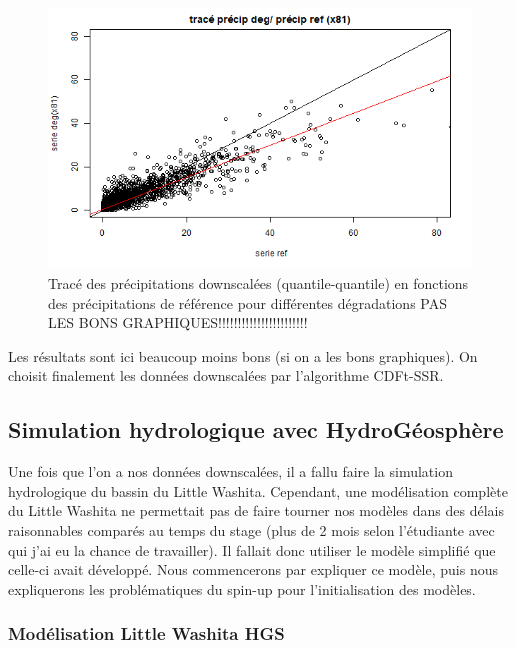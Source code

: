 \documentclass[a4paper,11pt]{article}
\numberwithin{equation}{section}
\begin{document}
\begin{figure}[H]
\begin{minipage}[b]{0.4\linewidth}
	\end{minipage}\hfill
	\begin{minipage}[b]{0.4\linewidth}	
		\centering \includegraphics[scale=0.4]{images/pr_4_dg.png}
	\end{minipage}
	\caption{Tracé des précipitations downscalées (quantile-quantile) en fonctions des précipitations de référence pour différentes dégradations PAS LES BONS GRAPHIQUES!!!!!!!!!!!!!!!!!!!!!!!}
\end{figure} 


Les résultats sont ici beaucoup moins bons (si on a les bons graphiques). On choisit finalement les données downscalées par l'algorithme CDFt-SSR.

\subsection{Simulation hydrologique avec HydroGéosphère}

Une fois que l'on a nos données downscalées, il a fallu faire la simulation hydrologique du bassin du Little Washita. Cependant, une modélisation complète du Little Washita ne permettait pas de faire tourner nos modèles dans des délais raisonnables comparés au temps du stage (plus de 2 mois selon l'étudiante avec qui j'ai eu la chance de travailler). Il fallait donc utiliser le modèle simplifié que celle-ci avait développé. Nous commencerons par expliquer ce modèle, puis nous expliquerons les problématiques du spin-up pour l'initialisation des modèles.  

\subsubsection{Modélisation Little Washita HGS}
\end{document}
